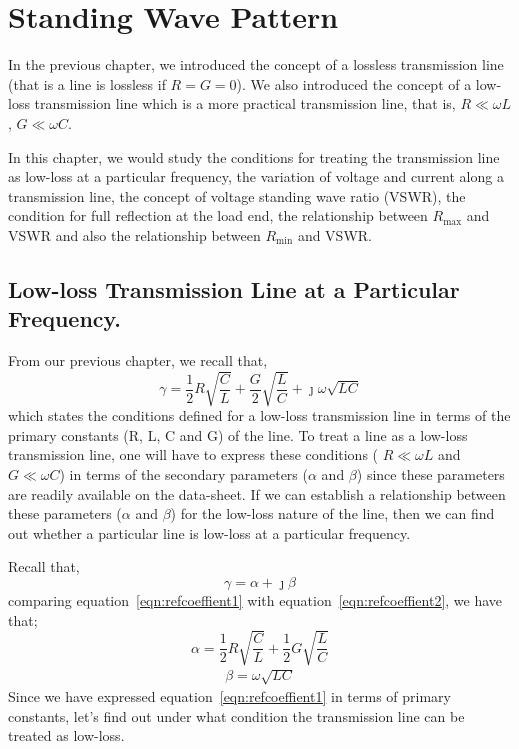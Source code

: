 \chapter{Standing Wave Pattern}\label{lec:lec5}
In the previous chapter, we introduced the concept of a lossless transmission line (that is a line is lossless if $R=G=0$). We also introduced the concept of a low-loss transmission line which is a more practical transmission line, that is, $R \ll \omega L$, $G \ll \omega C $.

In this chapter, we would study the conditions for treating the transmission line as low-loss at a particular frequency, the variation of voltage and current along a transmission line, the concept of voltage standing wave ratio (VSWR), the condition for full reflection at the load end, the relationship between $R_{\max}$ and VSWR and also the relationship between $R_{\min}$ and VSWR.

\section{Low-loss Transmission Line at a Particular Frequency.}
From our previous chapter, we recall that,
\begin{equation}
\gamma = \frac{1}{2}R\sqrt{\frac{C}{L}} + \frac{G}{2}\sqrt{\frac{L}{C}} +\jmath\omega\sqrt{LC}
\label{eqn:refcoeffient1}
\end{equation}
which states the conditions defined for a low-loss transmission line in terms of the primary constants (R, L, C and G) of the line. To treat a line as a low-loss transmission line, one will have to express these conditions ( $R \ll \omega L$ and $G \ll \omega C$) in terms of the secondary parameters ($\alpha$ and $\beta $) since these parameters are readily available on the data-sheet. If we can establish a relationship between these parameters ($\alpha$ and $\beta $) for the low-loss nature of the line, then we can find out whether a particular line is low-loss at a particular frequency.

Recall that,
\begin{equation}
\gamma = \alpha + \jmath\beta
\label{eqn:refcoeffient2}
\end{equation}
comparing equation~\ref{eqn:refcoeffient1} with equation~\ref{eqn:refcoeffient2}, we have that;
\begin{equation}
\alpha = \frac{1}{2}R\sqrt{\frac{C}{L}} + \frac{1}{2}G\sqrt{\frac{L}{C}}	
\label{eqn:attenconst}
\end{equation}
\begin{align}
\beta = \omega\sqrt{LC}
\end{align}
Since we have expressed equation~\ref{eqn:refcoeffient1} in terms of primary constants, let's find out under what condition the transmission line can be treated as low-loss.

